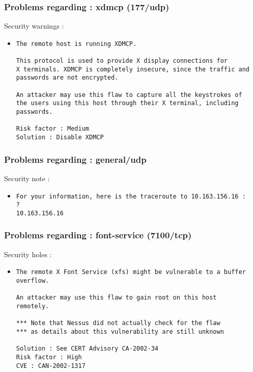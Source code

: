 \documentclass{article}
\begin{document}
\subsubsection{Problems regarding : xdmcp (177/udp)}
Security warnings :\\
\begin{itemize}
\item \begin{verbatim}
The remote host is running XDMCP.

This protocol is used to provide X display connections for 
X terminals. XDMCP is completely insecure, since the traffic and
passwords are not encrypted. 

An attacker may use this flaw to capture all the keystrokes of
the users using this host through their X terminal, including
passwords.

Risk factor : Medium
Solution : Disable XDMCP
\end{verbatim}\end{itemize}
\subsubsection{Problems regarding : general/udp}
Security note :\\
\begin{itemize}
\item \begin{verbatim}
For your information, here is the traceroute to 10.163.156.16 : 
?
10.163.156.16

\end{verbatim}\end{itemize}
\subsubsection{Problems regarding : font-service (7100/tcp)}
Security holes :\\
\begin{itemize}
\item \begin{verbatim}
The remote X Font Service (xfs) might be vulnerable to a buffer
overflow.

An attacker may use this flaw to gain root on this host
remotely.

*** Note that Nessus did not actually check for the flaw
*** as details about this vulnerability are still unknown

Solution : See CERT Advisory CA-2002-34
Risk factor : High
CVE : CAN-2002-1317
\end{verbatim}\end{itemize}
\end{document}
